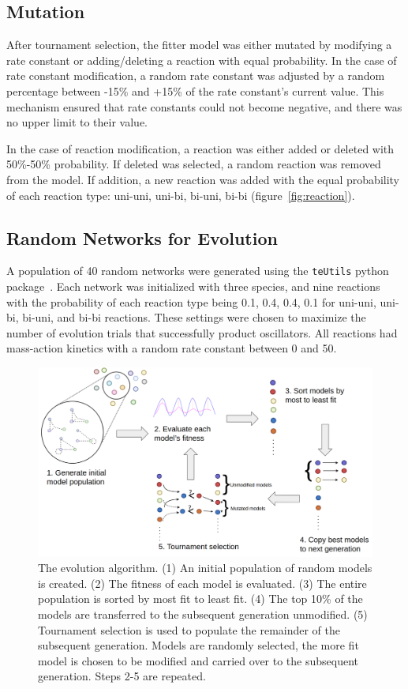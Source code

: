 \documentclass[12pt]{report}
\begin{document}
\subsection{Mutation}
After tournament selection, the fitter model was either mutated by modifying a rate constant or adding/deleting a reaction with equal probability. In the case of rate constant modification, a random rate constant was adjusted by a random percentage between -15\% and +15\% of the rate constant's current value. This mechanism ensured that rate constants could not become negative, and there was no upper limit to their value. 

In the case of reaction modification, a reaction was either added or deleted with 50\%-50\% probability. If deleted was selected, a random reaction was removed from the model. If addition, a new reaction was added with the equal probability of each reaction type: uni-uni, uni-bi, bi-uni, bi-bi (figure~\ref{fig:reaction}). 

\subsection{Random Networks for Evolution}
A population of 40 random networks were generated using the {\tt teUtils} python package~\cite{SauroteUtils_2020}. Each network was initialized with three species, and nine reactions with the probability of each reaction type being 0.1, 0.4, 0.4, 0.1 for uni-uni, uni-bi, bi-uni, and bi-bi reactions. These settings were chosen to maximize the number of evolution trials that successfully product oscillators. All reactions had mass-action kinetics with a random rate constant between 0 and 50. 
\begin{figure}
\begin{center}
    \includegraphics[width=17cm]{images/algorithm.png}
    \caption[Overview of the evolution algorithm in Python]{The evolution algorithm. (1) An initial population of random models is created. (2) The fitness of each model is evaluated. (3) The entire population is sorted by most fit to least fit. (4) The top 10\% of the models are transferred to the subsequent generation unmodified. (5)  Tournament selection is used to populate the remainder of the subsequent generation. Models are randomly selected, the more fit model is chosen to be modified and carried over to the subsequent generation. Steps 2-5 are repeated. }
    \label{fig:algorithm}
    \end{center}
\end{figure}
\end{document}
